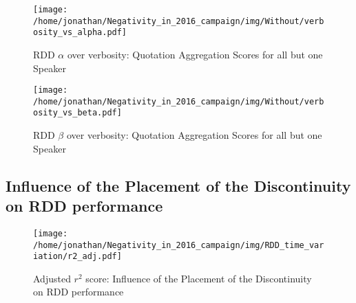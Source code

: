 \begin{figure}[h]\centering
	\texttt{[image: /home/jonathan/Negativity\_in\_2016\_campaign/img/Without/verbosity\_vs\_alpha.pdf]}
	\caption{RDD $\alpha$ over verbosity: Quotation Aggregation Scores for all but one Speaker}
	\label{fig: ablation_RDD alpha over verbosity}
\end{figure}

\begin{figure}[h]\centering
	\texttt{[image: /home/jonathan/Negativity\_in\_2016\_campaign/img/Without/verbosity\_vs\_beta.pdf]}
	\caption{RDD $\beta$ over verbosity: Quotation Aggregation Scores for all but one Speaker}
	\label{fig: ablation_RDD beta over verbosity}
\end{figure}

\clearpage
\pagebreak

\subsection{Influence of the Placement of the Discontinuity on RDD performance}

\begin{figure}[h]\centering
	\texttt{[image: /home/jonathan/Negativity\_in\_2016\_campaign/img/RDD\_time\_variation/r2\_adj.pdf]}
	\caption{Adjusted $r^2$ score: Influence of the Placement of the Discontinuity on RDD performance}
	\label{fig: rddtv_Adjusted r^2 score}
\end{figure}

\clearpage
\pagebreak

